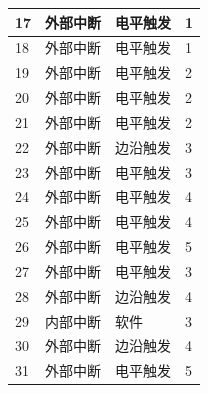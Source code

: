 \begin{longtable}[c]{ |p{1.5cm}|p{4.5cm}|p{4.5cm}|p{4cm}| }
    \hline
    17  & 外部中断    & 电平触发   & 1                 \\
    \hline
    18  & 外部中断    & 电平触发   & 1                 \\
    \hline
    19  & 外部中断    & 电平触发   & 2                 \\
    \hline
    20  & 外部中断    & 电平触发   & 2                 \\
    \hline
    21  & 外部中断    & 电平触发   & 2                 \\
    \hline
    22  & 外部中断    & 边沿触发    & 3                 \\
    \hline
    23  & 外部中断    & 电平触发   & 3                 \\
    \hline
    24  & 外部中断    & 电平触发   & 4                 \\
    \hline
    25  & 外部中断    & 电平触发   & 4                 \\
    \hline
    26  & 外部中断    & 电平触发   & 5                 \\
    \hline
    27  & 外部中断    & 电平触发   & 3                 \\
    \hline
    28  & 外部中断    & 边沿触发    & 4                 \\
    \hline
    29  & 内部中断    & 软件          & 3                 \\
    \hline
    30  & 外部中断    & 边沿触发    & 4                 \\
    \hline
    31  & 外部中断    & 电平触发   & 5                 \\
    
\end{longtable}
